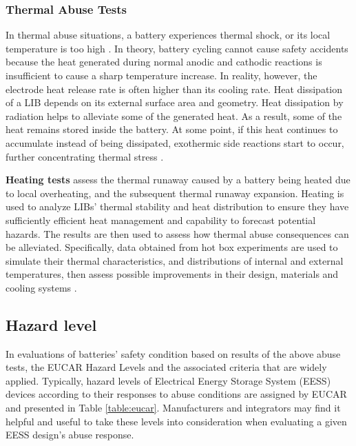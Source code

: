 \subsubsection{Thermal Abuse Tests}
\label{sec:thermal-abuse-tests}
In thermal abuse situations, a battery experiences thermal shock, or its local temperature is too high \cite{wang2019thermal}. In theory, battery cycling cannot cause safety accidents because the heat generated during normal anodic and cathodic reactions is insufficient to cause a sharp temperature increase. In reality, however, the electrode heat release rate is often higher than its cooling rate. Heat dissipation of a LIB depends on its external surface area and geometry. Heat dissipation by radiation helps to alleviate some of the generated heat. As a result, some of the heat remains stored inside the battery. At some point, if this heat continues to accumulate instead of being dissipated, exothermic side reactions start to occur, further concentrating thermal stress \cite{bandhauer2011critical}.

\textbf{Heating tests} assess the thermal runaway caused by a battery being heated due to local overheating, and the subsequent thermal runaway expansion. Heating is used to analyze LIBs' thermal stability and heat distribution to ensure they have sufficiently efficient heat management and capability to forecast potential hazards. The results are then used to assess how thermal abuse consequences can be alleviated. Specifically, data obtained from hot box experiments are used to simulate their thermal characteristics, and distributions of internal and external temperatures, then assess possible improvements in their design, materials and cooling systems \cite{chen2021review}.

\subsection{Hazard level}
\label{sec:hazard-level}
In evaluations of batteries' safety condition based on results of the above abuse tests, the EUCAR Hazard Levels \cite{eucar2019} and the associated criteria that are widely applied. Typically, hazard levels of Electrical Energy Storage System (EESS) devices according to their responses to abuse conditions are assigned by EUCAR and presented in Table \ref{table:eucar}. Manufacturers and integrators may find it helpful and useful to take these levels into consideration when evaluating a given EESS design's abuse response.


